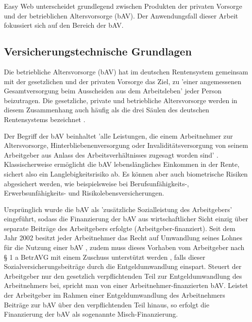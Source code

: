 Easy Web unterscheidet grundlegend zwischen Produkten der privaten Vorsorge und der betrieblichen Altersvorsorge (bAV). Der Anwendungsfall dieser Arbeit fokussiert sich auf den Bereich der bAV.

\subsection{Versicherungstechnische Grundlagen}\label{subsec:versicherungsgrundlagen}

Die betriebliche Altersvorsorge (bAV) hat im deutschen Rentensystem gemeinsam mit der gesetzlichen und der privaten Vorsorge das Ziel, zu 'einer angemessenen Gesamtversorgung beim Ausscheiden aus dem Arbeitsleben' \cite[S. 12]{buttler2017einfuehrung} jeder Person beizutragen. Die gesetzliche, private und betriebliche Altersvorsorge werden in diesem Zusammenhang auch häufig als die drei Säulen des deutschen Rentensystems bezeichnet \cite[S. 3]{plato2016betriebliche}. 

Der Begriff der bAV beinhaltet 'alle Leistungen, die einem Arbeitnehmer zur Altersvorsorge, Hinterbliebenenversorgung oder Invaliditätsversorgung von seinem Arbeitgeber aus Anlass des Arbeitsverhältnisses zugesagt worden sind' \cite[S. 1]{buttler2017einfuehrung}. Klassischerweise ermöglicht die bAV lebenslängliches Einkommen in der Rente, sichert also ein Langlebigkeitsrisiko ab. Es können aber auch biometrische Risiken abgesichert werden, wie beispielsweise bei Berufsunfähigkeits-, Erwerbsunfähigkeits- und Risikolebensversicherungen. 

Ursprünglich wurde die bAV als 'zusätzliche Sozialleistung des Arbeitgebers' \cite[S. 7]{buttler2017einfuehrung} eingeführt, sodass die Finanzierung der bAV aus wirtschaftlicher Sicht einzig über separate Beiträge des Arbeitgebers erfolgte (Arbeitgeber-finanziert). Seit dem Jahr 2002 besitzt jeder Arbeitnehmer das Recht auf Umwandlung seines Lohnes für die Nutzung einer bAV \cite[S. 23]{buttler2017einfuehrung}, zudem muss dieses Vorhaben vom Arbeitgeber nach § 1 a BetrAVG mit einem Zuschuss unterstützt werden \cite[S. 29]{buttler2017einfuehrung}, falls dieser Sozialversicherungsbeiträge durch die Entgeldumwandlung einspart. Steuert der Arbeitgeber nur den gesetzlich verpflichtenden Teil zur Entgeldumwandlung des Arbeitnehmers bei, spricht man von einer Arbeitnehmer-finanzierten bAV. Leistet der Arbeitgeber im Rahmen einer Entgeldumwandlung des Arbeitnehmers Beiträge zur bAV über den verpflichtenden Teil hinaus, so erfolgt die Finanzierung der bAV als sogenannte Misch-Finanzierung.

